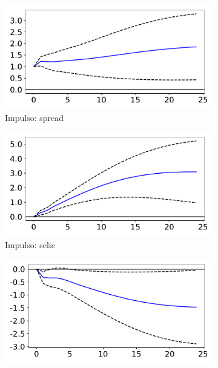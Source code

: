 \documentclass[a4paper,
               article,
               12pt,
               openany,
               oneside,
               english,
               brazil]{abntex2}
\numberwithin{equation}{section}
\begin{document}
    \begin{figure}[!hbt]
        \caption{Função de impulso-resposta (spread)}
        \label{irf}
        \begin{subfigure}[t]{.5\linewidth}
            \includegraphics[width = \textwidth, scale=1]{irf/spread_spread.pdf}
            \caption{Impulso: spread}
        \end{subfigure}
        \begin{subfigure}[t]{.5\linewidth}
            \includegraphics[width = \textwidth, scale=1]{irf/spread_selic.pdf}
            \caption{Impulso: selic}
        \end{subfigure}
        \begin{subfigure}[t]{.5\linewidth}
            \includegraphics[width = \textwidth, scale=1]{irf/spread_inad.pdf}

\end{subfigure}
\end{figure}
\end{document}
